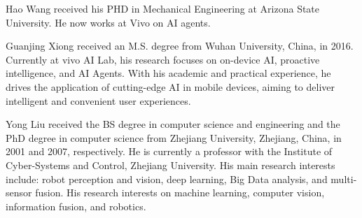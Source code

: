 \vspace{-3em}

\begin{IEEEbiography}{Hao Wang}
received his PHD in Mechanical Engineering at Arizona State University. He now works at Vivo on AI agents.
\end{IEEEbiography}

\vspace{-3em}

\begin{IEEEbiography}{Guanjing Xiong}
received an M.S. degree from Wuhan University, China, in 2016. Currently at vivo AI Lab, his research focuses on on-device AI, proactive intelligence, and AI Agents. With his academic and practical experience, he drives the application of cutting-edge AI in mobile devices, aiming to deliver intelligent and convenient user experiences.
\end{IEEEbiography}

\vspace{-3em}

\begin{IEEEbiography}{Yong Liu}
received the BS degree in computer science and engineering and the PhD degree in computer science from Zhejiang University, Zhejiang, China, in 2001 and 2007, respectively. He is currently a professor with the Institute of Cyber-Systems and Control, Zhejiang University. His main research interests include: robot perception and vision, deep learning, Big Data analysis, and multi-sensor fusion. His research interests on machine learning, computer vision, information fusion, and robotics.
\end{IEEEbiography} 

